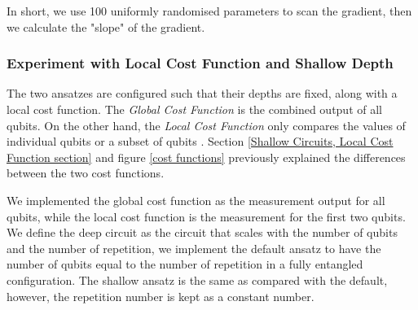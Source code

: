 In short, we use 100 uniformly randomised parameters to scan the gradient, then we calculate the "slope" of the gradient.

\subsubsection{Experiment with Local Cost Function and Shallow Depth}
The two ansatzes are configured such that their depths are fixed, along with a local cost function.
The \textit{Global Cost Function} is the combined output of all qubits. 
On the other hand, the \textit{Local Cost Function} only compares the values of individual qubits or a subset of qubits \cite{cerezoCostFunctionDependent2021}.
Section \ref{Shallow Circuits, Local Cost Function section} and figure \ref{cost functions} previously explained the differences between the two cost functions.

We implemented the global cost function as the measurement output for all qubits, while the local cost function is the measurement for the first two qubits.
We define the deep circuit as the circuit that scales with the number of qubits and the number of repetition, we implement the default ansatz to have the number of qubits equal to the number of repetition in a fully entangled configuration. 
The shallow ansatz is the same as compared with the default, however, the repetition number is kept as a constant number.